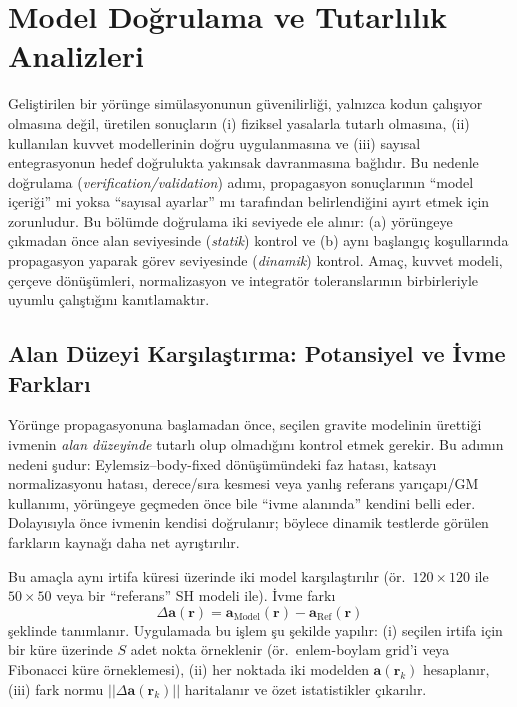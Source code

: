 \newpage
\section{Model Doğrulama ve Tutarlılık Analizleri}

Geliştirilen bir yörünge simülasyonunun güvenilirliği, yalnızca kodun çalışıyor olmasına değil, üretilen sonuçların
(i) fiziksel yasalarla tutarlı olmasına, (ii) kullanılan kuvvet modellerinin doğru uygulanmasına ve (iii) sayısal
entegrasyonun hedef doğrulukta yakınsak davranmasına bağlıdır. Bu nedenle doğrulama (\textit{verification/validation})
adımı, propagasyon sonuçlarının ``model içeriği'' mi yoksa ``sayısal ayarlar'' mı tarafından belirlendiğini ayırt etmek için
zorunludur. Bu bölümde doğrulama iki seviyede ele alınır: (a) yörüngeye çıkmadan önce alan seviyesinde
(\textit{statik}) kontrol ve (b) aynı başlangıç koşullarında propagasyon yaparak görev seviyesinde (\textit{dinamik}) kontrol.
Amaç, kuvvet modeli, çerçeve dönüşümleri, normalizasyon ve integratör toleranslarının birbirleriyle uyumlu çalıştığını
kanıtlamaktır.

\subsection{Alan Düzeyi Karşılaştırma: Potansiyel ve İvme Farkları}
Yörünge propagasyonuna başlamadan önce, seçilen gravite modelinin ürettiği ivmenin \emph{alan düzeyinde} tutarlı olup olmadığını
kontrol etmek gerekir. Bu adımın nedeni şudur: Eylemsiz--body-fixed dönüşümündeki faz hatası, katsayı normalizasyonu hatası,
derece/sıra kesmesi veya yanlış referans yarıçapı/GM kullanımı, yörüngeye geçmeden önce bile ``ivme alanında'' kendini belli eder.
Dolayısıyla önce ivmenin kendisi doğrulanır; böylece dinamik testlerde görülen farkların kaynağı daha net ayrıştırılır.

Bu amaçla aynı irtifa küresi üzerinde iki model karşılaştırılır (ör.\ $120\times120$ ile $50\times50$ veya bir ``referans'' SH
modeli ile). İvme farkı
\begin{equation}
\Delta \mathbf{a}(\mathbf{r}) = \mathbf{a}_{\text{Model}}(\mathbf{r}) - \mathbf{a}_{\text{Ref}}(\mathbf{r})
\end{equation}
şeklinde tanımlanır. Uygulamada bu işlem şu şekilde yapılır:
(i) seçilen irtifa için bir küre üzerinde $S$ adet nokta örneklenir (ör.\ enlem-boylam grid'i veya Fibonacci küre örneklemesi),
(ii) her noktada iki modelden $\mathbf a(\mathbf r_k)$ hesaplanır, (iii) fark normu
$||\Delta \mathbf a(\mathbf r_k)||$ haritalanır ve özet istatistikler çıkarılır.

